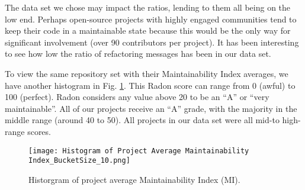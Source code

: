 The data set we chose may impact the ratios, lending to them all being on the low end. Perhaps open-source projects with highly engaged communities tend to keep their code in a maintainable state because this would be the only way for significant involvement (over 90 contributors per project). It has been interesting to see how low the ratio of refactoring messages has been in our data set.

To view the same repository set with their Maintainability Index averages, we have another histogram in Fig. \ref{figHistogramAvgMI}. This Radon score can range from 0 (awful) to 100 (perfect). Radon considers any value above 20 to be an ``A'' or ``very maintainable''. All of our projects receive an ``A'' grade, with the majority in the middle range (around 40 to 50). All projects in our data set were all mid-to high-range scores.

\begin{figure}[ht]
  \centerline{
    \texttt{[image: Histogram of Project Average Maintainability Index\_BucketSize\_10.png]}
  }
  \caption{Historgram of project average Maintainability Index (MI).}
  \label{figHistogramAvgMI}
\end{figure}
